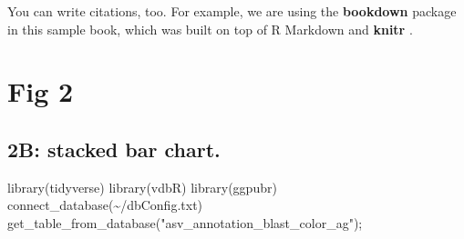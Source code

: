 \documentclass[
]{book}
\newenvironment{Shaded}{\begin{snugshade}}{\end{snugshade}}
\newcommand{\CommentTok}[1]{\textcolor[rgb]{0.56,0.35,0.01}{\textit{#1}}}
\newcommand{\FunctionTok}[1]{\textcolor[rgb]{0.00,0.00,0.00}{#1}}
\newcommand{\NormalTok}[1]{#1}
\newcommand{\OtherTok}[1]{\textcolor[rgb]{0.56,0.35,0.01}{#1}}
\newcommand{\SpecialCharTok}[1]{\textcolor[rgb]{0.00,0.00,0.00}{#1}}
\newcommand{\StringTok}[1]{\textcolor[rgb]{0.31,0.60,0.02}{#1}}
\begin{document}
You can write citations, too. For example, we are using the \textbf{bookdown} package \citep{R-bookdown} in this sample book, which was built on top of R Markdown and \textbf{knitr} \citep{xie2015}.

\hypertarget{fig-2}{%
\chapter{Fig 2}\label{fig-2}}

\hypertarget{b-stacked-bar-chart.}{%
\section{2B: stacked bar chart.}\label{b-stacked-bar-chart.}}

\begin{Shaded}
\begin{Highlighting}[]
\FunctionTok{library}\NormalTok{(tidyverse)}
\FunctionTok{library}\NormalTok{(vdbR)}
\FunctionTok{library}\NormalTok{(ggpubr)}
\FunctionTok{connect\_database}\NormalTok{(}\StringTok{\textquotesingle{}\textasciitilde{}/dbConfig.txt\textquotesingle{}}\NormalTok{)}
\FunctionTok{get\_table\_from\_database}\NormalTok{(}\StringTok{"asv\_annotation\_blast\_color\_ag"}\NormalTok{);}
\end{Highlighting}
\end{Shaded}

\begin{Shaded}
\end{Shaded}
\end{document}
